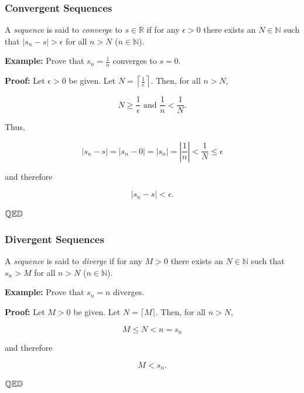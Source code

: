 \documentclass[10pt]{beamer}
\def\R{\mathbb{R}}                     %
\def\N{\mathbb{N}}                     %
\def\Q{\mathbb{Q}}                     %
\def\D{\mathbb{D}}                     %
\def\qed{ \hspace*{\fill} \Q \mathbb{E} \D}
\begin{document}
\begin{frame}
  \frametitle{Convergent Sequences}

  A \textit{sequence} is said to \textit{converge} to $s \in \R$ if for any $\epsilon > 0$ there exists an $N \in \N$ such that $\vert s_n - s \vert > \epsilon$ for all $n > N$ ($n \in \N$). \pause
  \vspace{5mm}

  \textbf{Example:} Prove that $s_n = \frac{1}{n}$ converges to $s = 0$. \pause
  \vspace{5mm}

  \textbf{Proof:} Let $\epsilon > 0$ be given. \pause Let $N = \left \lceil \frac{1}{\epsilon} \right \rceil$. Then, for all $n > N$, \pause

  \[ N \ge \frac{1}{\epsilon} \text{ and } \frac{1}{n} < \frac{1}{N}. \] \pause

  Thus,

  \[ \left \vert s_n - s \right \vert = \left \vert s_n - 0 \right \vert =  \left \vert s_n \right \vert =
  \left \vert \frac{1}{n} \right \vert < \frac{1}{N} \le \epsilon \] \pause

  and therefore

  \[ \left \vert s_n - s \right \vert < \epsilon. \] \pause

  $\qed$

\end{frame}


\begin{frame}
  \frametitle{Divergent Sequences}

  A \textit{sequence} is said to \textit{diverge} if for any $M > 0$ there exists an $N \in \N$ such that $s_n > M$ for all $n > N$ ($n \in \N$). \pause
  \vspace{5mm}

  \textbf{Example:} Prove that $s_n = n$ diverges. \pause
  \vspace{5mm}

  \textbf{Proof:} Let $M>0$ be given. \pause Let $N = \lceil M \rceil$. \pause Then, for all $n > N$,

  \[ M \le N < n = s_n \] \pause

  and therefore

  \[ M < s_n. \] \pause

  $\qed$

\end{frame}
\end{document}
